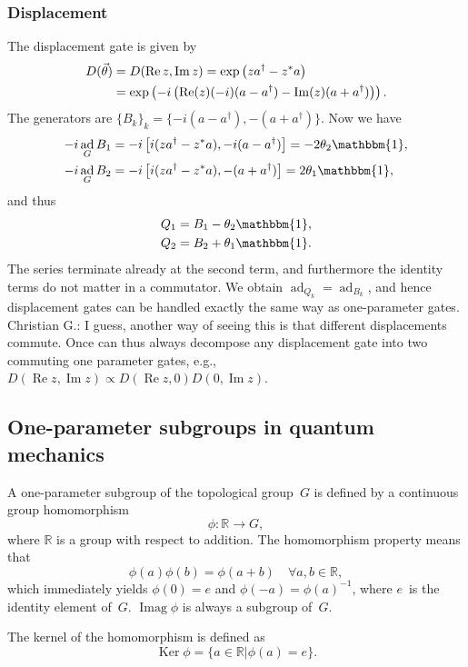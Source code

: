 \documentclass[aps,pra,10pt,twocolumn,groupedaddress,nofootinbib]{revtex4-1}
\theoremstyle{plain}
\DeclareMathOperator{\re}{Re}
\DeclareMathOperator{\im}{Im}
\DeclareMathOperator{\ad}{ad}
\DeclareMathOperator{\Ker}{Ker}    %
\DeclareMathOperator{\Imag}{Imag}  %
\newcommand{\be}{\begin{equation}}
\newcommand{\ee}{\end{equation}}
\newcommand{\R}{\ensuremath{\mathbb R}}  %
\newcommand{\I}{\mathbbm{1}} %
\newcommand{\comm}[2]{\ensuremath{\left[#1, #2\right]}}             %
\newcommand{\cg}[1]{\textcolor{cyan!80!black}{Christian G.: #1}}
\begin{document}
\subsubsection{Displacement}

The displacement gate is given by
\begin{align}
  D(\vec{\theta}) &= D(\re z, \im z) = \exp\left( za^\dagger -z^* a\right)\\
  \notag
&= \exp\left(-i\left(\re(z)(-i)(a-a^\dagger) -\im(z)(a+a^\dagger)\right)\right).
\end{align}
The generators are $\{B_k\}_k = \{-i(a-a^\dagger), -(a+a^\dagger)\}$.
Now we have
\begin{align*}
  -i \ad_G B_1 &= -i\comm{i(za^\dagger -z^* a)}{-i(a-a^\dagger)}
  = -2 \theta_2 \I,\\
  -i\ad_G B_2 &= -i\comm{i(za^\dagger -z^* a)}{-(a+a^\dagger)}
  = 2 \theta_1 \I,
\end{align*}
and thus
\begin{align*}
Q_1 &= B_1 -\theta_{2} \I,\\
Q_2 &= B_2 +\theta_{1} \I.
\end{align*}
The series terminate already at the second term, and furthermore
the identity terms do not matter in a commutator.
We obtain $\ad_{Q_k} = \ad_{B_k}$, and
hence displacement gates can be handled exactly the same way as one-parameter gates.
\cg{I guess, another way of seeing this is that different displacements commute. Once can thus always decompose any displacement gate into two commuting one parameter gates, e.g., $D(\re z, \im z) \propto D(\re z, 0) D(0, \im z)$.}

\subsection{One-parameter subgroups in quantum mechanics}

A one-parameter subgroup of the topological group~$G$ is defined by a continuous group homomorphism
\be
\phi: \R \to G,
\ee
where $\R$ is a group with respect to addition.
The homomorphism property means that
\be
\phi(a)\phi(b) = \phi(a+b) \quad \forall a,b \in \R,
\ee
which immediately yields
$\phi(0) = e$ and $\phi(-a) = \phi(a)^{-1}$,
where $e$~is the identity element of~$G$.
$\Imag \phi$ is always a subgroup of~$G$.

The kernel of the homomorphism is defined as
\be
\Ker \phi = \{a \in \R | \phi(a) = e\}.
\ee
\end{document}
